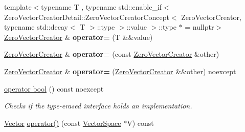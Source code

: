 \begin{DoxyCompactItemize}
\item 
\hypertarget{classSpacy_1_1ZeroVectorCreator_a6bf1e05757880d3fdd6a1c481237d0a1}{{\footnotesize template$<$typename T , typename std\-::enable\-\_\-if$<$ Zero\-Vector\-Creator\-Detail\-::\-Zero\-Vector\-Creator\-Concept$<$ Zero\-Vector\-Creator, typename std\-::decay$<$ T $>$\-::type $>$\-::value $>$\-::type $\ast$  = nullptr$>$ }\\\hyperlink{classSpacy_1_1ZeroVectorCreator}{\-Zero\-Vector\-Creator} \& {\bfseries operator=} (\-T \&\&value)}\label{classSpacy_1_1ZeroVectorCreator_a6bf1e05757880d3fdd6a1c481237d0a1}

\item 
\hypertarget{classSpacy_1_1ZeroVectorCreator_ab2aed3130e7dd4eefbeb8b6f21346359}{\hyperlink{classSpacy_1_1ZeroVectorCreator}{\-Zero\-Vector\-Creator} \& {\bfseries operator=} (const \hyperlink{classSpacy_1_1ZeroVectorCreator}{\-Zero\-Vector\-Creator} \&other)}\label{classSpacy_1_1ZeroVectorCreator_ab2aed3130e7dd4eefbeb8b6f21346359}

\item 
\hypertarget{classSpacy_1_1ZeroVectorCreator_a5924f0aa3af06b2c493540842a8f196b}{\hyperlink{classSpacy_1_1ZeroVectorCreator}{\-Zero\-Vector\-Creator} \& {\bfseries operator=} (\hyperlink{classSpacy_1_1ZeroVectorCreator}{\-Zero\-Vector\-Creator} \&\&other) noexcept}\label{classSpacy_1_1ZeroVectorCreator_a5924f0aa3af06b2c493540842a8f196b}

\item 
\hyperlink{classSpacy_1_1ZeroVectorCreator_a2a716f5d88147abcdf73e834ec349c06}{operator bool} () const noexcept
\begin{DoxyCompactList}\small\item\em \-Checks if the type-\/erased interface holds an implementation. \end{DoxyCompactList}\item 
\hypertarget{classSpacy_1_1ZeroVectorCreator_afb20329c56ee527505ef7390eba96870}{\hyperlink{classSpacy_1_1Vector}{\-Vector} \hyperlink{classSpacy_1_1ZeroVectorCreator_afb20329c56ee527505ef7390eba96870}{operator()} (const \hyperlink{classSpacy_1_1VectorSpace}{\-Vector\-Space} $\ast$\-V) const }\label{classSpacy_1_1ZeroVectorCreator_afb20329c56ee527505ef7390eba96870}


\end{DoxyCompactItemize}
